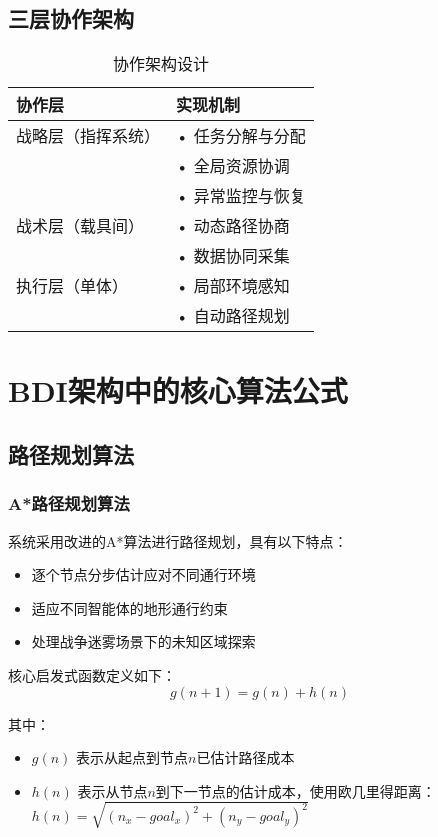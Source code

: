 \documentclass[12pt,a4paper]{article}
\begin{document}
\subsection{三层协作架构}

\begin{table}[h]
\centering
\caption{协作架构设计}
\begin{tabular}{|>{\centering\arraybackslash}p{4cm}|>{\raggedright\arraybackslash}p{9cm}|}
\hline
\textbf{协作层} & \textbf{实现机制} \\
\hline
\rowcolor{lightgray}
战略层（指挥系统） & • 任务分解与分配\\
& • 全局资源协调\\
& • 异常监控与恢复\\
\hline
战术层（载具间） & • 动态路径协商\\
& • 数据协同采集\\
\hline
\rowcolor{lightgray}
执行层（单体） & • 局部环境感知\\
& • 自动路径规划\\
\hline
\end{tabular}
\end{table}




\section{BDI架构中的核心算法公式}

\subsection{路径规划算法}

\subsubsection{A*路径规划算法}
系统采用改进的A*算法进行路径规划，具有以下特点：

\begin{itemize}
\item 逐个节点分步估计应对不同通行环境
\item 适应不同智能体的地形通行约束 
\item 处理战争迷雾场景下的未知区域探索
\end{itemize}

核心启发式函数定义如下：
\begin{equation}
g(n+1) = g(n) + h(n)
\end{equation}

其中：
\begin{itemize}
\item $g(n)$ 表示从起点到节点$n$已估计路径成本
\item $h(n)$ 表示从节点$n$到下一节点的估计成本，使用欧几里得距离：\\$h(n) = \sqrt{(n_x - goal_x)^2 + (n_y - goal_y)^2}$
\end{itemize}
\end{document}
